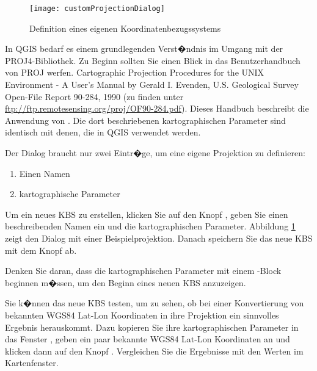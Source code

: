\begin{figure}[ht]
   \begin{center}
   \caption{Definition eines eigenen Koordinatenbezugssystems \nixcaption}
   \label{fig:customprojections}\smallskip
   \texttt{[image: customProjectionDialog]}
\end{center}  
\end{figure}

In QGIS bedarf es einem grundlegenden Verst�ndnis im Umgang mit der
PROJ4-Bibliothek. Zu Beginn sollten Sie einen Blick in das Benutzerhandbuch
von PROJ werfen. Cartographic Projection Procedures for the UNIX Environment
- A User's Manual by Gerald I. Evenden, U.S. Geological Survey Open-File Report
90-284, 1990 (zu finden unter \url{ftp://ftp.remotesensing.org/proj/OF90-284.pdf}).
Dieses Handbuch beschreibt die Anwendung von . Die dort
beschriebenen kartographischen Parameter sind identisch mit denen, die in QGIS
verwendet werden.

Der Dialog  braucht
nur zwei Eintr�ge, um eine eigene Projektion zu definieren:

\begin{enumerate}
\item Einen Namen
\item kartographische Parameter 
\end{enumerate}

Um ein neues KBS zu erstellen, klicken Sie auf den Knopf
, geben Sie einen beschreibenden Namen ein
und die kartographischen Parameter. Abbildung \ref{fig:customprojections}
zeigt den Dialog mit einer Beispielprojektion. Danach speichern Sie das neue
KBS mit dem Knopf  ab. 

Denken Sie daran, dass die kartographischen Parameter mit einem
-Block beginnen m�ssen, um den Beginn eines neuen KBS
anzuzeigen. 

Sie k�nnen das neue KBS testen, um zu sehen, ob bei einer Konvertierung
von bekannten WGS84 Lat-Lon Koordinaten in ihre Projektion ein sinnvolles
Ergebnis herauskommt. Dazu kopieren Sie ihre kartographischen Parameter in
das Fenster , geben ein paar bekannte WGS84 Lat-Lon
Koordinaten an und klicken dann auf den Knopf . Vergleichen
Sie die Ergebnisse mit den Werten im Kartenfenster.

